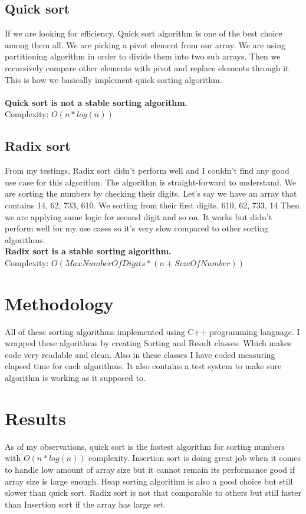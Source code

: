 \documentclass{article}
\begin{document}
\subsection{Quick sort}
If we are looking for efficiency, Quick sort algorithm is one of the best choice among them all.
We are picking a pivot element from our array. We are using partitioning algorithm in order to divide them into two sub arrays. Then we recursively compare other elements with pivot and replace elements through it. This is how we basically implement quick sorting algorithm.\\
\\\textbf{Quick sort is not a stable sorting algorithm.}\\
Complexity: $O(n * log(n))$\\

\subsection{Radix sort}
From my testings, Radix sort didn't perform well and I couldn't find any good use case for this algorithm.
The algorithm is straight-forward to understand.
We are sorting the numbers by checking their digits. Let's say we have an array that contains 14, 62, 733, 610.
We sorting from their first digits, 610, 62, 733, 14
Then we are applying same logic for second digit and so on.
It works but didn't perform well for my use cases so it's very slow compared to other sorting algorithms.
\\\textbf{Radix sort is a stable sorting algorithm.}\\
Complexity: $O(MaxNumberOfDigits * (n + SizeOfNumber))$\\


\section{Methodology}
All of these sorting algorithms implemented using C++ programming language. I wrapped these algorithms by creating Sorting and Result classes. Which makes code very readable and clean. Also in these classes I have coded measuring elapsed time for each algorithms. It also contains a test system to make sure algorithm is working as it supposed to. 

\section{Results}
As of my observations, quick sort is the fastest algorithm for sorting numbers with $O(n * log(n))$ complexity.
Insertion sort is doing great job when it comes to handle low amount of array size but it cannot remain its performance good if array size is large enough.
Heap sorting algorithm is also a good choice but still slower than quick sort.
Radix sort is not that comparable to others but still faster than Insertion sort if the array has large set.
\end{document}
